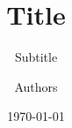 
\title[Title at bottom]{Title}
\subtitle{Subtitle}
\author[Authors at bottom]{Authors}
\date[\today]{\today}
